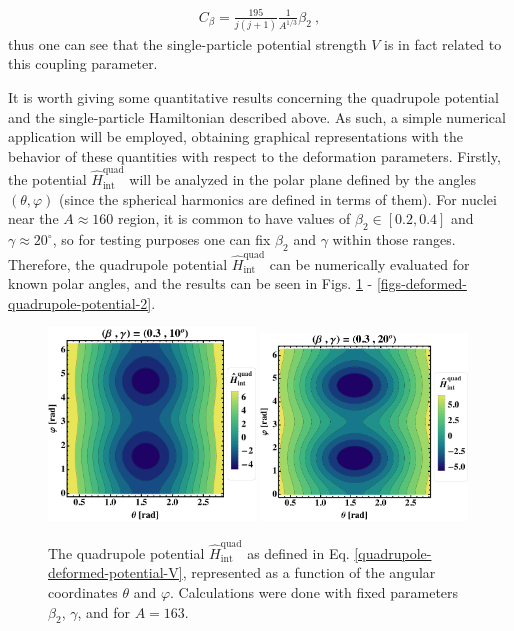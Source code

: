 \begin{align}
    C_\beta=\frac{195}{j(j+1)}\frac{1}{A^{1/3}}\beta_2\ ,
\end{align}
thus one can see that the single-particle potential strength $V$ is in fact related to this coupling parameter.

It is worth giving some quantitative results concerning the quadrupole potential and the single-particle Hamiltonian described above. As such, a simple numerical application will be employed, obtaining graphical representations with the behavior of these quantities with respect to the deformation parameters. Firstly, the potential $\hat{H}_\text{int}^\text{quad}$ will be analyzed in the polar plane defined by the angles $(\theta,\varphi)$ (since the spherical harmonics are defined in terms of them). For nuclei near the $A\approx 160$ region, it is common to have values of $\beta_2\in\left[0.2,0.4\right]$ and $\gamma\approx 20^\circ$, so for testing purposes one can fix $\beta_2$ and $\gamma$ within those ranges. Therefore, the quadrupole potential $\hat{H}_\text{int}^\text{quad}$ can be numerically evaluated for known polar angles, and the results can be seen in Figs. \ref{figs-deformed-quadrupole-potential-1} - \ref{figs-deformed-quadrupole-potential-2}.
\begin{figure}
    \centering
    \includegraphics[width=0.49\textwidth]{Chapters/Figures/quadrupole-potentialV-1.pdf}
    \includegraphics[width=0.49\textwidth]{Chapters/Figures/quadrupole-potentialV-2.pdf}
    \caption{The quadrupole potential $\hat{H}_\text{int}^\text{quad}$ as defined in Eq. \ref{quadrupole-deformed-potential-V}, represented as a function of the angular coordinates $\theta$ and $\varphi$. Calculations were done with fixed parameters $\beta_2$, $\gamma$, and for $A=163$.}
    \label{figs-deformed-quadrupole-potential-1}
\end{figure}

